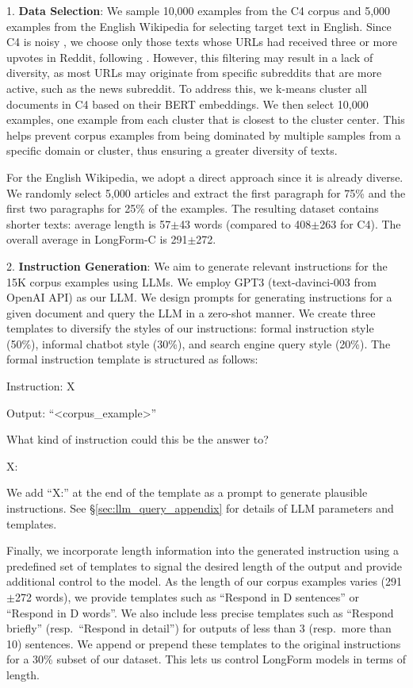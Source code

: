 1. \textbf{Data Selection}: We sample 10,000 examples from the C4 corpus and 5,000 examples from the English Wikipedia for selecting target text in English. Since C4 is noisy \cite{dodge-etal-2021-documenting}, we choose only those texts whose URLs had received three or more upvotes in Reddit, following \citet{radford2019language}. However, this filtering may result in a lack of diversity, as most URLs may originate from specific subreddits that are more active, such as the news subreddit. To address this, we k-means cluster all documents in C4 based on their BERT embeddings. We then select 10,000 examples, one example from each cluster that is closest to the cluster center. This helps  prevent corpus examples from being dominated by multiple samples from a specific domain or cluster, thus ensuring a greater diversity of texts.

For the English Wikipedia, we adopt a direct approach since it is already diverse. We randomly select 5,000 articles and extract the first paragraph for 75\%
 and the first two paragraphs for 25\% of the examples. The resulting dataset contains shorter texts:  average length is 57$\pm$43 words (compared to 408$\pm$263  for C4). The overall average in LongForm-C is 291$\pm$272.

	2. \textbf{Instruction Generation}: We aim to generate relevant instructions for the 15K corpus examples using LLMs. We employ GPT3 (text-davinci-003 from OpenAI API) as our LLM. We design prompts for generating instructions for a given document and query the LLM in a zero-shot manner. We create three templates to diversify the styles of our instructions: formal instruction style
	(50\%), informal chatbot style (30\%), and search engine query style (20\%). The formal instruction template is structured as follows:

\begin{mdframed}[style=MyFrame,hidealllines=true,backgroundcolor=gray!5]
		\small
		Instruction: X  

		 Output: ``<corpus\_example>''

		 What kind of instruction could this be the answer to?  

		 X:
	\end{mdframed}

We add ``X:'' at the end of the template as a prompt to generate plausible instructions. See \S\ref{sec:llm_query_appendix} for details of LLM parameters and templates.

Finally, we incorporate length information into the generated instruction using a predefined set of templates to signal the desired length of the output and provide additional control to the model. As the length of our corpus examples varies (291$\pm$272 words), we provide templates such as ``Respond in D sentences'' or ``Respond in D words''. We also include less precise templates such as ``Respond briefly''
(resp.\ ``Respond in detail'') for outputs of less than 3 (resp.\ more than 10) sentences. We append or prepend these templates to the original instructions for a 30\%
subset of our dataset. This lets us control LongForm models in terms of length. 

